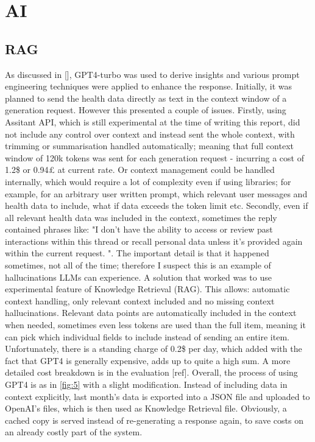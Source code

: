 \section{AI}
\subsection{RAG}
As discussed in [], GPT4-turbo was used to derive insights and various prompt engineering techniques were applied to enhance the response. Initially, it was planned to send the health data directly as text in the context window of a generation request. However this presented a couple of issues. Firstly, using Assitant API, which is still experimental at the time of writing this report, did not include any control over context and instead sent the whole context, with trimming or summarisation handled automatically; meaning that full context window of 120k tokens was sent for each generation request - incurring a cost of 1.2\$ or 0.94£ at current rate. Or context management could be handled internally, which would require a lot of complexity even if using libraries; for example, for an arbitrary user written prompt, which relevant user messages and health data to include, what if data exceeds the token limit etc. Secondly, even if all relevant health data was included in the context, sometimes the reply contained phrases like: "I don't have the ability to access or review past interactions within this thread or recall personal data unless it's provided again within the current request. ". The important detail is that it happened sometimes, not all of the time; therefore I suspect this is an example of hallucinations LLMs can experience. A solution that worked was to use experimental feature of Knowledge Retrieval (RAG). This allows: automatic context handling, only relevant context included and no missing context hallucinations. Relevant data points are automatically included in the context when needed, sometimes even less tokens are used than the full item, meaning it can pick which individual fields to include instead of sending an entire item. Unfortunately, there is a standing charge of 0.2\$ per day, which added with the fact that GPT4 is generally expensive, adds up to quite a high sum. A more detailed cost breakdown is in the evaluation [ref]. Overall, the process of using GPT4 is as in \ref{fig:5} with a slight modification. Instead of including data in context explicitly, last month's data is exported into a JSON file and uploaded to OpenAI's files, which is then used as Knowledge Retrieval file. Obviously, a cached copy is served instead of re-generating a response again, to save costs on an already costly part of the system.

